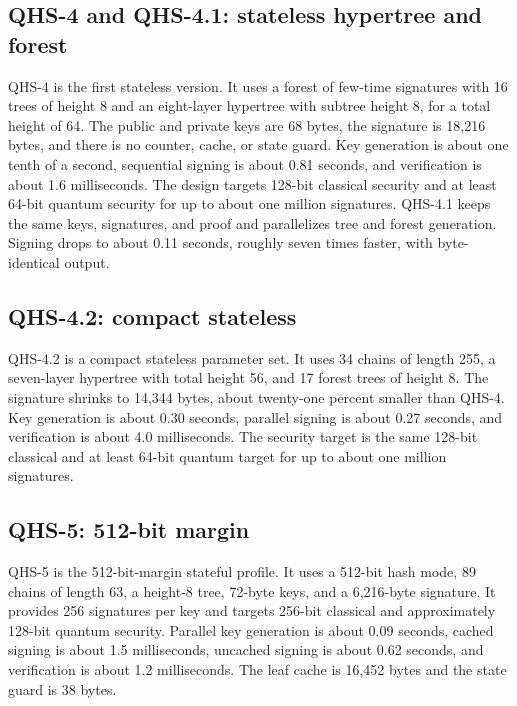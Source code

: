 \documentclass[11pt,a4paper]{article}
\begin{document}
\subsection{QHS-4 and QHS-4.1: stateless hypertree and forest}

QHS-4 is the first stateless version. It uses a forest of few-time signatures
with 16 trees of height 8 and an eight-layer hypertree with subtree height 8,
for a total height of 64. The public and private keys are 68 bytes, the
signature is 18,216 bytes, and there is no counter, cache, or state guard.
Key generation is about one tenth of a second, sequential signing is about
0.81 seconds, and verification is about 1.6 milliseconds. The design targets
128-bit classical security and at least 64-bit quantum security for up to about
one million signatures. QHS-4.1 keeps the same keys, signatures, and proof and
parallelizes tree and forest generation. Signing drops to about 0.11 seconds,
roughly seven times faster, with byte-identical output.

\subsection{QHS-4.2: compact stateless}

QHS-4.2 is a compact stateless parameter set. It uses 34 chains of length 255,
a seven-layer hypertree with total height 56, and 17 forest trees of height 8.
The signature shrinks to 14,344 bytes, about twenty-one percent smaller than
QHS-4. Key generation is about 0.30 seconds, parallel signing is about 0.27
seconds, and verification is about 4.0 milliseconds. The security target is the
same 128-bit classical and at least 64-bit quantum target for up to about one
million signatures.

\subsection{QHS-5: 512-bit margin}

QHS-5 is the 512-bit-margin stateful profile. It uses a 512-bit hash mode,
89 chains of length 63, a height-8 tree, 72-byte keys, and a 6,216-byte
signature. It provides 256 signatures per key and targets 256-bit classical and
approximately 128-bit quantum security. Parallel key generation is about
0.09 seconds, cached signing is about 1.5 milliseconds, uncached signing is
about 0.62 seconds, and verification is about 1.2 milliseconds. The leaf cache
is 16,452 bytes and the state guard is 38 bytes.
\end{document}
